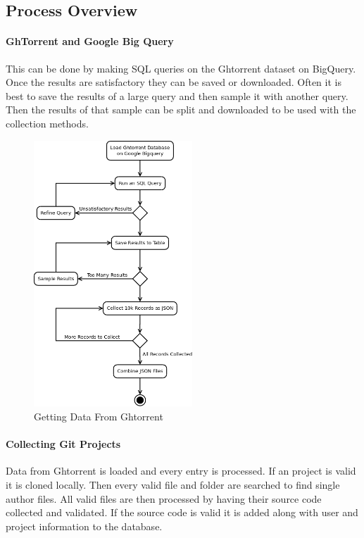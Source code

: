 \documentclass{article}
\begin{document}
\subsection{Process Overview}

\paragraph{GhTorrent and Google Big Query}
This can be done by making SQL queries on the Ghtorrent dataset on BigQuery. Once the results are satisfactory they can be saved or downloaded. Often it is best to save the results of a large query and then sample it with another query. Then the results of that sample can be split and downloaded to be used with the collection methods.

\begin{figure}[!h]
    \centering
    \includegraphics[height=10cm]{diagrams/ght_process.png}
    \caption{Getting Data From Ghtorrent}
\end{figure}

\paragraph{Collecting Git Projects}
Data from Ghtorrent is loaded and every entry is processed. If an project is valid it is cloned locally. Then every valid file and folder are searched to find single author files. All valid files are then processed by having their source code collected and validated. If the source code is valid it is added along with user and project information to the database.
\end{document}
